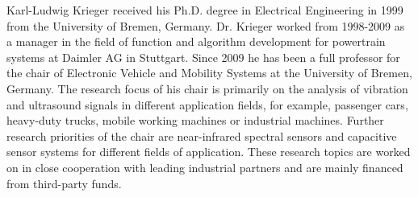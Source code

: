 \begin{IEEEbiography}{Karl-Ludwig Krieger} received his Ph.D. degree in Electrical Engineering in 1999 from the University of Bremen, Germany. Dr. Krieger worked from 1998-2009 as a manager in the field of function and algorithm development for powertrain systems at Daimler AG in Stuttgart. Since 2009 he has been a full professor for the chair of Electronic Vehicle and Mobility Systems at the University of Bremen, Germany. The research focus of his chair is primarily on the analysis of vibration and ultrasound signals in different application fields, for example, passenger cars, heavy-duty trucks, mobile working machines or industrial machines. Further research priorities of the chair are near-infrared spectral sensors and capacitive sensor systems for different fields of application. These research topics are worked on in close cooperation with leading industrial partners and are mainly financed from third-party funds.
\end{IEEEbiography}


